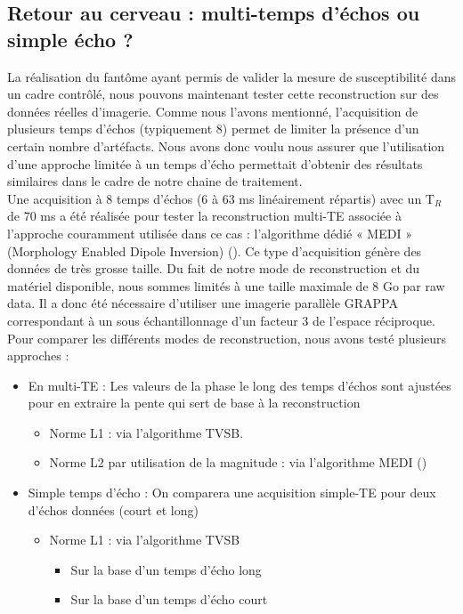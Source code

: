 {\subsection{Retour au cerveau : multi-temps d’échos ou simple écho ?}
La réalisation du fantôme ayant permis de valider la mesure de susceptibilité dans un cadre
contrôlé, nous pouvons maintenant tester cette reconstruction sur des données réelles d’imagerie.
Comme nous l’avons mentionné, l’acquisition de plusieurs temps d’échos (typiquement 8) permet de
limiter la présence d’un certain nombre d’artéfacts. Nous avons donc voulu nous assurer que
l’utilisation d’une approche limitée à un temps d’écho permettait d’obtenir des résultats similaires
dans le cadre de notre chaine de traitement.\\
Une acquisition à 8 temps d’échos (6 à 63 ms linéairement répartis) avec un T$_R$ de 70 ms a été
réalisée pour tester la reconstruction multi-TE associée à l’approche couramment utilisée dans ce cas :
l’algorithme dédié « MEDI » (Morphology Enabled Dipole Inversion) (\cite{Liu2011b}). Ce type d’acquisition génère
des données de très grosse taille. Du fait de notre mode de reconstruction et du matériel disponible,
nous sommes limités à une taille maximale de 8 Go par raw data. Il a donc été nécessaire d’utiliser une
imagerie parallèle GRAPPA correspondant à un sous échantillonnage d’un facteur 3 de l’espace
réciproque.\\
Pour comparer les différents modes de reconstruction, nous avons testé plusieurs approches :
\begin{itemize}
	\item En multi-TE : Les valeurs de la phase le long des temps d’échos sont ajustées pour en extraire
	la pente qui sert de base à la reconstruction
	\begin{itemize}
		\item Norme L1 : via l’algorithme TVSB.
		\item Norme L2 par utilisation de la magnitude : via l’algorithme MEDI (\cite{Liu2011b})
	\end{itemize}
	\item Simple temps d’écho : On comparera une acquisition simple-TE pour deux d’échos données
	(court et long)
	\begin{itemize}
		\item Norme L1 : via l’algorithme TVSB
		\begin{itemize}
			\item Sur la base d’un temps d’écho long
			\item Sur la base d’un temps d’écho court

\end{itemize}
\end{itemize}
\end{itemize}}
